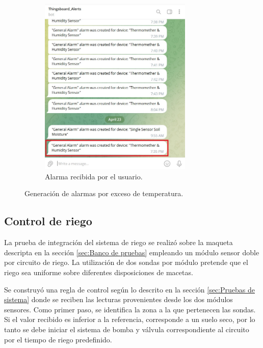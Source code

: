 \begin{figure}[!h]
\begin{subfigure}[b]{0.45\textwidth}
		\includegraphics[width=0.80\textwidth]{./Figures/chapter4/temp_user_alarm.jpg}
		\caption{Alarma recibida por el usuario.}
		\label{fig:temp_alarm_user}
     \end{subfigure}
     \hfill
        \caption[Generación de alarmas por exceso de temperatura]{Generación de alarmas por exceso de temperatura.}
        \label{fig:tb_clima_automation}
\end{figure}


\pagebreak
\subsection{Control de riego}
\label{sec:Control de riego}

La prueba de integración del sistema de riego se realizó sobre la maqueta descripta en la sección  \ref{sec:Banco de pruebas} empleando un módulo sensor doble por circuito de riego. La utilización de dos sondas por módulo pretende que el riego sea uniforme sobre diferentes disposiciones de macetas. 

Se construyó una regla de control según lo descrito en la sección \ref{sec:Pruebas de sistema} donde se reciben las lecturas provenientes desde los dos módulos sensores. Como primer paso, se identifica la zona a la que pertenecen las sondas. Si el valor recibido es inferior a la referencia, corresponde a un suelo seco, por lo tanto se debe iniciar el sistema de bomba y válvula correspondiente al circuito por el tiempo de riego predefinido.


